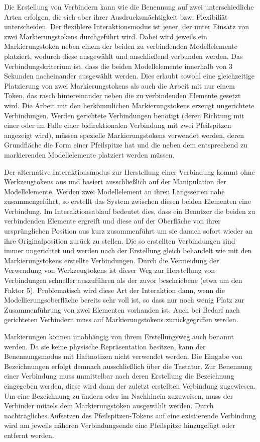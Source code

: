 Die Erstellung von Verbindern kann wie die Benennung auf zwei unterschiedliche Arten erfolgen, die sich aber ihrer Ausdrucksmächtigkeit bzw. Flexibiliät unterscheiden. Der flexiblere Interaktionsmodus ist jener, der unter Einsatz von zwei Markierungstokens durchgeführt wird. Dabei wird jeweils ein Markierungstoken neben einem der beiden zu verbindenden Modellelemente platziert, wodurch diese ausgewählt und anschließend verbunden werden. Das Verbindungskriterium ist, dass die beiden Modellelemente innerhalb von 3 Sekunden nacheinander ausgewählt werden. Dies erlaubt sowohl eine gleichzeitige Platzierung von zwei Markierungstokens als auch die Arbeit mit nur einem Token, das rasch hintereinander neben die zu verbindenden Elemente gesetzt wird. Die Arbeit mit den herkömmlichen Markierungstokens erzeugt ungerichtete Verbindungen. Werden gerichtete Verbindungen benötigt (deren Richtung mit einer oder im Falle einer bidirektionalen Verbindung mit zwei Pfeilspitzen angezeigt wird), müssen spezielle Markierungstokens verwendet werden, deren Grundfläche die Form einer Pfeilspitze hat und die neben dem entsprechend zu markierenden Modellelemente platziert werden müssen.

Der alternative Interaktionsmodus zur Herstellung einer Verbindung kommt ohne Werkzeugtokens aus und basiert ausschließlich auf der Manipulation der Modellelemente. Werden zwei Modellelement an ihren Längsseiten nahe zusammengeführt, so erstellt das System zwischen diesen beiden Elementen eine Verbindung. Im Interaktionsablauf bedeutet dies, dass ein Benutzer die beiden zu verbindenden Elemente ergreift und diese auf der Oberfläche von ihrer ursprünglichen Position aus kurz zusammenführt um sie danach sofort wieder an ihre Originalposition zurück zu stellen. Die so erstellten Verbindungen sind immer ungerichtet und werden nach der Erstellung gleich behandelt wie mit den Markierungstokens erstellte Verbindungen. Durch die Vermeidung der Verwendung von Werkzeugtokens ist dieser Weg zur Herstellung von Verbindungen schneller auszuführen als der zuvor beschriebene (etwa um den Faktor 5). Problematisch wird diese Art der Interaktion dann, wenn die Modellierungsoberfläche bereits sehr voll ist, so dass nur noch wenig Platz zur Zusammenführung von zwei Elementen vorhanden ist. Auch bei Bedarf nach gerichteten Verbindern muss auf Markierungstokens zurückgegriffen werden.

Markierungen können unabhängig von ihrem Erstellungsweg auch benannt werden. Da sie keine physische Repräsentation besitzen, kann der Benennungsmodus mit Haftnotizen nicht verwendet werden. Die Eingabe von Bezeichnungen erfolgt demnach ausschließlich über die Tastatur. Zur Benennung einer Verbindung muss unmittelbar nach deren Erstellung die Bezeichnung eingegeben werden, diese wird dann der zuletzt erstellten Verbindung zugewiesen. Um eine Bezeichnung zu ändern oder im Nachhinein zuzuweisen, muss der Verbinder mittels dem Markierungstoken ausgewählt werden. Durch nachträgliches Aufsetzen des Pfeilspitzen-Tokens auf eine existierende Verbindung wird am jeweils näheren Verbindungsende eine Pfeilspitze hinzugefügt oder entfernt werden.

